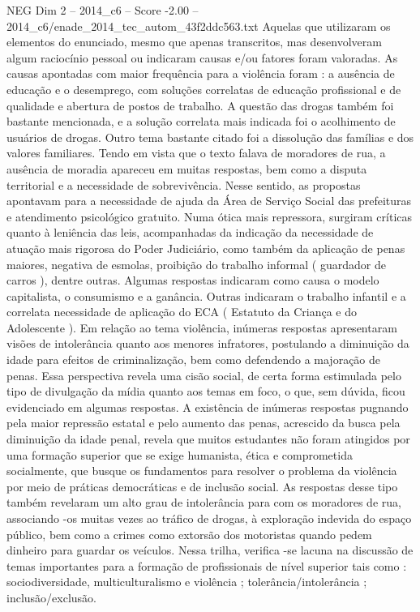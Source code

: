 \begin{textsample}{NEG Dim 2 – 2014\_c6 – Score -2.00 – 2014\_c6/enade\_2014\_tec\_autom\_43f2ddc563.txt}
Aquelas que utilizaram os elementos do enunciado, mesmo que apenas transcritos, mas desenvolveram algum raciocínio pessoal ou indicaram causas e/ou fatores foram valoradas.
As causas apontadas com maior frequência para a violência foram : a ausência de educação e o desemprego, com soluções correlatas de educação profissional e de qualidade e abertura de postos de trabalho.
A questão das drogas também foi bastante mencionada, e a solução correlata mais indicada foi o acolhimento de usuários de drogas.
Outro tema bastante citado foi a dissolução das famílias e dos valores familiares.
Tendo em vista que o texto falava de moradores de rua, a ausência de moradia apareceu em muitas respostas, bem como a disputa territorial e a necessidade de sobrevivência.
Nesse sentido, as propostas apontavam para a necessidade de ajuda da Área de Serviço Social das prefeituras e atendimento psicológico gratuito.
Numa ótica mais repressora, surgiram críticas quanto à leniência das leis, acompanhadas da indicação da necessidade de atuação mais rigorosa do Poder Judiciário, como também da aplicação de penas maiores, negativa de esmolas, proibição do trabalho informal ( guardador de carros ), dentre outras.
Algumas respostas indicaram como causa o modelo capitalista, o consumismo e a ganância.
Outras indicaram o trabalho infantil e a correlata necessidade de aplicação do ECA ( Estatuto da Criança e do Adolescente ).
Em relação ao tema violência, inúmeras respostas apresentaram visões de intolerância quanto aos menores infratores, postulando a diminuição da idade para efeitos de criminalização, bem como defendendo a majoração de penas.
Essa perspectiva revela uma cisão social, de certa forma estimulada pelo tipo de divulgação da mídia quanto aos temas em foco, o que, sem dúvida, ficou evidenciado em algumas respostas.
A existência de inúmeras respostas pugnando pela maior repressão estatal e pelo aumento das penas, acrescido da busca pela diminuição da idade penal, revela que muitos estudantes não foram atingidos por uma formação superior que se exige humanista, ética e comprometida socialmente, que busque os fundamentos para resolver o problema da violência por meio de práticas democráticas e de inclusão social.
As respostas desse tipo também revelaram um alto grau de intolerância para com os moradores de rua, associando -os muitas vezes ao tráfico de drogas, à exploração indevida do espaço público, bem como a crimes como extorsão dos motoristas quando pedem dinheiro para guardar os veículos.
Nessa trilha, verifica -se lacuna na discussão de temas importantes para a formação de profissionais de nível superior tais como : sociodiversidade, multiculturalismo e violência ; tolerância/intolerância ; inclusão/exclusão.

\end{textsample}
